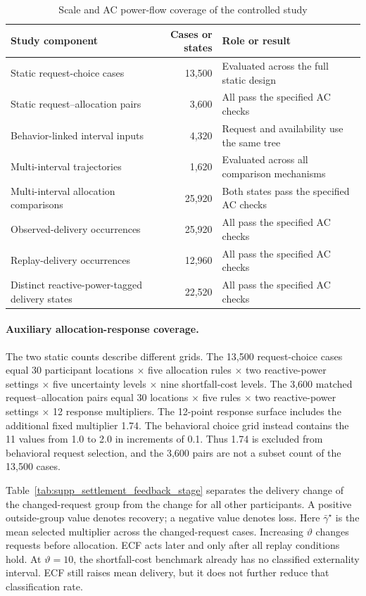 \documentclass[11pt]{article}
\begin{document}
\begin{table}[!t]
\caption{Scale and AC power-flow coverage of the controlled study}
\label{tab:supp_behavior_evidence_layers}
\centering
\scriptsize
\setlength{\tabcolsep}{3.2pt}
\begin{tabularx}{\columnwidth}{@{}XrX@{}}
\hline
Study component & Cases or states & Role or result \\
\hline
Static request-choice cases & 13,500 & Evaluated across the full static design \\
Static request--allocation pairs & 3,600 & All pass the specified AC checks \\
Behavior-linked interval inputs & 4,320 & Request and availability use the same tree \\
Multi-interval trajectories & 1,620 & Evaluated across all comparison mechanisms \\
Multi-interval allocation comparisons & 25,920 & Both states pass the specified AC checks \\
Observed-delivery occurrences & 25,920 & All pass the specified AC checks \\
Replay-delivery occurrences & 12,960 & All pass the specified AC checks \\
Distinct reactive-power-tagged delivery states & 22,520 & All pass the specified AC checks \\
\hline
\end{tabularx}
\end{table}

\paragraph{Auxiliary allocation-response coverage.}
The two static counts describe different grids. The 13,500 request-choice cases
equal 30 participant locations $\times$ five allocation rules $\times$ two
reactive-power settings $\times$ five uncertainty levels $\times$ nine
shortfall-cost levels. The 3,600 matched request--allocation pairs equal 30
locations $\times$ five rules $\times$ two reactive-power settings $\times$ 12
response multipliers. The 12-point response surface includes the additional fixed multiplier 1.74.
The behavioral choice grid instead contains the 11 values from 1.0 to 2.0 in
increments of 0.1. Thus 1.74 is excluded from behavioral request
selection, and the 3,600 pairs are not a subset count of the 13,500 cases.

Table~\ref{tab:supp_settlement_feedback_stage} separates the delivery change of
the changed-request group from the change for all other participants. A positive
outside-group value denotes recovery; a negative value denotes loss. Here
$\bar\gamma^\star$ is the mean selected multiplier across the changed-request
cases. Increasing $\vartheta$ changes requests before allocation. ECF acts later
and only after all replay conditions hold. At $\vartheta=10$, the
shortfall-cost benchmark already has no classified externality interval. ECF
still raises mean delivery, but it does not further reduce that classification
rate.
\end{document}

